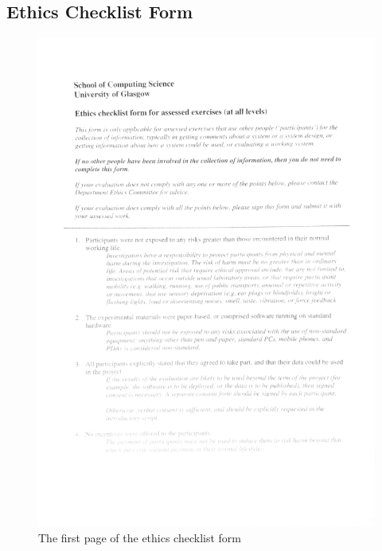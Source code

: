 \documentclass{4thYearProject}
\begin{document}
\begin{appendices}
\chapter{Ethics Checklist Form}
\begin{figure}
\includegraphics[scale=0.15]{Checklist_1}
\centering
\caption{The first page of the ethics checklist form}
\label{fig:Checklist1}
\end{figure}


\end{appendices}
\end{document}
